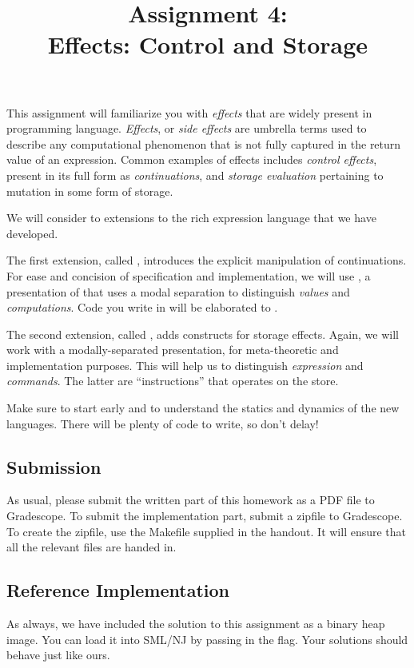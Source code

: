 \documentclass[11pt]{article}
\title{Assignment 4: \\
       Effects: Control and Storage}
\begin{document}
\maketitle

This assignment will familiarize you with \emph{effects} that are widely present in programming language.
\emph{Effects}, or \emph{side effects} are umbrella terms used to describe any computational phenomenon that is
not fully captured in the return value of an expression. Common examples of effects includes \emph{control effects},
present in its full form as \emph{continuations}, and \emph{storage evaluation} pertaining to mutation in some
form of storage.

We will consider to extensions to the rich expression language that we have developed.

The first extension, called \LangKPCF{}, introduces the explicit manipulation of continuations.
For ease and concision of specification and implementation, we will use \LangKPCFv{}, a presentation of \LangKPCF{} that uses a modal separation to distinguish \emph{values} and \emph{computations}.
Code you write in \LangKPCF{} will be elaborated to \LangKPCFv{}.

The second extension, called \LangMA{}, adds constructs for storage effects.
Again, we will work with a modally-separated presentation, for meta-theoretic and implementation purposes.
This will help us to distinguish \emph{expression} and \emph{commands}. The latter are ``instructions'' that
operates on the store.

Make sure to start early and to understand the statics and dynamics of the
new languages. There will be plenty of code to write, so don't delay!

\subsection*{Submission}

As usual, please submit the written part of this homework as a
PDF file to Gradescope. To submit the implementation part, submit a
zipfile to Gradescope. To create the zipfile, use the Makefile supplied in the
handout. It will ensure that all the relevant files are handed in.

\subsection*{Reference Implementation}

As always, we have included the solution to this assignment as a binary heap image.
You can load it into SML/NJ by passing in the  flag.
Your solutions should behave just like ours.
\end{document}
